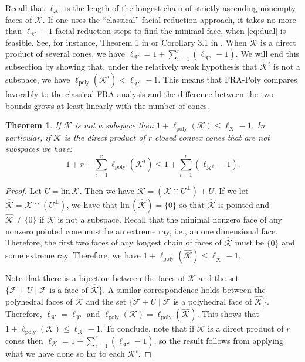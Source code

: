 \documentclass{article}
\newcommand{\lineality}{\mathrm{lin}\,}
\newcommand{\stdCone}{ {\mathcal{K}}}
\newcommand{\stdFace}{ \mathcal{F}}
\newcommand{\distP}{\ell _{\text{poly}}}
\newtheorem{theorem}[definition]{Theorem}
\begin{document}
Recall that $\ell _\stdCone$ is the length of the longest chain of 
strictly ascending nonempty faces of $\stdCone$.
If one uses the ``classical'' facial reduction approach, it takes no more than $\ell _\stdCone - 1$
facial reduction steps to find the minimal face, when \eqref{eq:dual} is feasible. 
See, for instance, Theorem 1 in \cite{pataki_strong_2013} or  Corollary 3.1 in \cite{article_waki_muramatsu}.
When $\stdCone$ is a direct product of several 
cones, we have $\ell _\stdCone  = 1 + \sum _{i=1}^{r} (\ell _{\stdCone^i} -1)$. We will 
end this subsection by showing that, under the relatively weak hypothesis 
that $\stdCone^i$ is not a subspace, we have $\distP(\stdCone ^i) < \ell _{\stdCone^i } - 1$. This means that FRA-Poly compares favorably to the classical FRA analysis  and the 
difference between the two bounds grows at least linearly with the number of cones.


\begin{theorem}\label{theo:dist_comp2}
If $\stdCone$ is not a subspace then $1 + \distP(\stdCone) \leq \ell _{\stdCone }-1$.
In particular, if $\stdCone $ is the direct product of $r$ closed convex 
cones that are not subspaces we have:
\begin{equation*}
 1 + r + \sum _{i=1}^{r} \distP(\stdCone ^i)   \leq 1 + \sum _{i=1}^{r} (\ell _{\stdCone^i} -1).
\end{equation*}
\end{theorem}
\begin{proof}
Let $U = \lineality \stdCone$. Then we have $\stdCone = (\stdCone\cap U^\perp) + U$.
If we let $\hat \stdCone =  \stdCone\cap (U^\perp) $, we have that 
$\lineality (\hat \stdCone ) = \{0\}$ so that $\hat \stdCone$ is pointed and 
$\hat \stdCone \neq \{0\}$ if $\stdCone$ is not a subspace. Recall that the minimal nonzero face of any nonzero 
pointed cone must be an extreme ray, i.e., an one dimensional face.
Therefore,  the first two faces of any longest chain of faces of $\hat \stdCone$ must be $\{0\}$ 
and some extreme ray. Therefore, we have 
$1 + \distP(\hat \stdCone) \leq \ell _{\hat \stdCone} -1 $. 

Note that there is a bijection 
between the faces of $\stdCone$ and the set $\{\stdFace + U \mid \stdFace \text{ is a face of } \hat \stdCone \}$. A similar 
 correspondence holds between the polyhedral faces of $\stdCone$  and the set $\{\stdFace + U \mid \stdFace \text{ is a polyhedral face of } \hat \stdCone \}$.
 Therefore, $\ell _\stdCone = \ell _{\hat \stdCone}$ and $ \distP(\stdCone) = \distP(\hat \stdCone)$.
 This shows that $1 + \distP(\stdCone)  \leq \ell _{\stdCone }-1$. 
 To conclude, note that if $\stdCone$ is a direct product of $r$ cones then
 $\ell _{\stdCone} = 1 + \sum _{i=1}^{r} (\ell _{\stdCone^i} -1)$, so the result 
 follows from applying what we have done so far to each $\stdCone^i$.
\end{proof}
\end{document}
